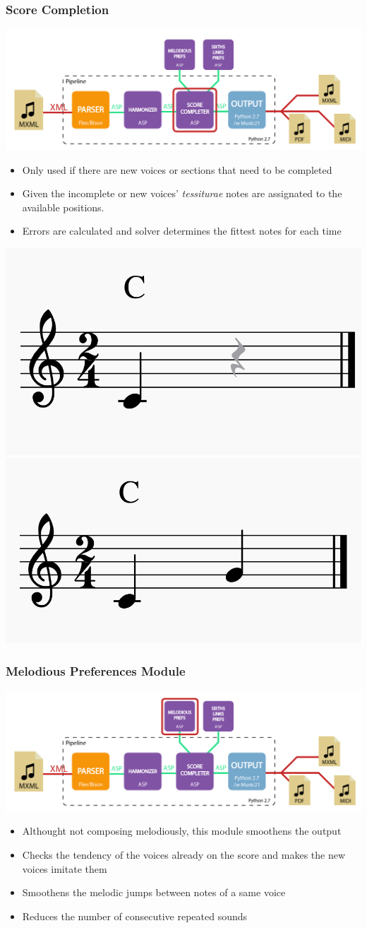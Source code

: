\documentclass[english]{beamer}
\begin{document}
	\begin{frame}[t]
	\frametitle{Score Completion}
	\begin{center}
			\includegraphics[width=0.6\linewidth]{imagenes/arch_trans/arquitectura_final_asp_comp-01.png}
			\end{center}
	\begin{itemize}
		\item Only used if there are new voices or sections that need to be completed
		\item Given the incomplete or new voices' \textit{tessiturae} notes are assignated to the available positions.
		\item Errors are calculated and solver determines the fittest notes for each time
	\end{itemize}
		\begin{center}
				\includegraphics[width=0.25\linewidth]{imagenes/incomplete_score.png}
				\includegraphics[width=0.25\linewidth]{imagenes/completed_score.png}
		\end{center}
	\end{frame}
	\begin{frame}[t]
	\frametitle{Melodious Preferences Module}
	\begin{center}
			\includegraphics[width=0.6\linewidth]{imagenes/arch_trans/arquitectura_final_asp_pref_mel-01.png}
			\end{center}
	\begin{itemize}
		\item Althought not composing melodiously, this module smoothens the output
		\item Checks the tendency of the voices already on the score and makes the new voices imitate them
		\item Smoothens the melodic jumps between notes of a same voice
		\item Reduces the number of consecutive repeated sounds
	\end{itemize}
	\end{frame}
\end{document}
